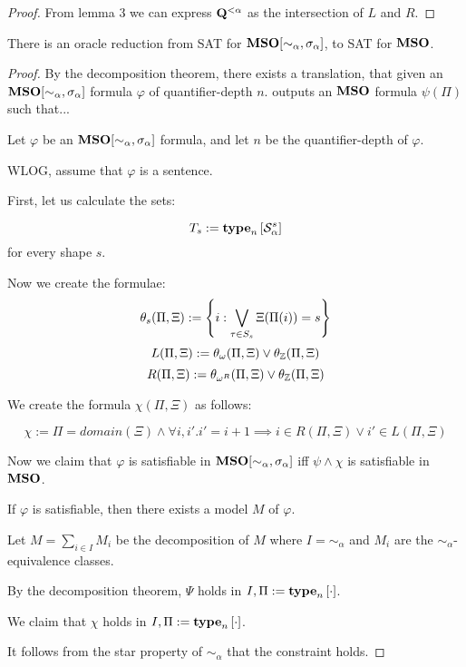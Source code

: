\begin{proof}
  From lemma 3 we can express $\mathbf{Q}^{< \alpha}$ as the intersection
  of $L$ and $R$.
\end{proof}

\begin{theorem}
  There is an oracle reduction from SAT for $\mathbf{MSO}[\sim_{\alpha}, \sigma_{\alpha}]$,
  to SAT for $\mathbf{MSO}$.
\end{theorem}

\begin{proof}
  By the decomposition theorem, there exists a translation,
  that given an $\mathbf{MSO}[\sim_{\alpha}, \sigma_{\alpha}]$ formula $\varphi$ of quantifier-depth $n$.
  outputs an $\mathbf{MSO}$ formula $\psi(\Pi)$ such that...

  Let $\varphi$ be an $\mathbf{MSO}[\sim_{\alpha}, \sigma_{\alpha}]$ formula,
  and let $n$ be the quantifier-depth of $\varphi$.

  WLOG, assume that $\varphi$ is a sentence.

  First, let us calculate the sets:
  
  $$T_s := \mathbf{type}_{n} \left[ {\mathcal{S}^{s}_{\alpha}} \right]$$
  for every shape $s$.

  Now we create the formulae:
  $$\theta_s(\Pi, \Xi) := \left\{ {i : \bigvee_{\tau \in S_s}{\Xi(\Pi(i)) = s}} \right\}$$
  $$L(\Pi, \Xi) := \theta_{\omega}(\Pi, \Xi) \vee \theta_{\mathbb{Z}}(\Pi, \Xi)$$
  $$R(\Pi, \Xi) := \theta_{\omega^R}(\Pi, \Xi) \vee \theta_{\mathbb{Z}}(\Pi, \Xi)$$

  We create the formula $\chi(\Pi, \Xi)$ as follows:

  $$\chi := \Pi = domain(\Xi) \wedge \forall i, i'. i' = i + 1 \implies {i \in R(\Pi, \Xi) \vee i' \in L(\Pi, \Xi)}$$

  Now we claim that $\varphi$ is satisfiable in $\mathbf{MSO}[\sim_{\alpha}, \sigma_{\alpha}]$
  iff $\psi \land \chi$ is satisfiable in $\mathbf{MSO}$.

  If $\varphi$ is satisfiable, then there exists a model $M$ of $\varphi$.

  Let $M = \sum_{i \in I} M_i$ be the decomposition of $M$
  where $I = \sim_{\alpha}$ and $M_i$ are the $\sim_{\alpha}$-equivalence classes.

  By the decomposition theorem, $\Psi$ holds
  in $I, \Pi := \mathbf{type}_{n} \left[ {\cdot} \right]$.

  We claim that $\chi$ holds in $I, \Pi := \mathbf{type}_{n} \left[ {\cdot} \right]$. 
  
  It follows from the star property of $\sim_{\alpha}$ that the constraint holds.


\end{proof}
